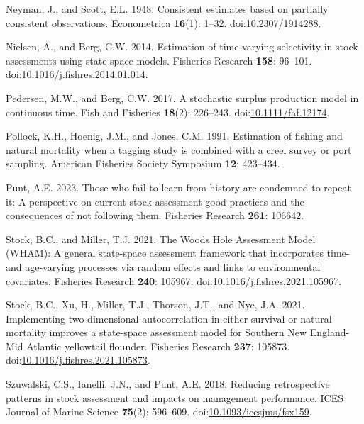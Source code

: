 \documentclass[
  12pt,
]{article}
\newlength{\cslhangindent}
\newenvironment{CSLReferences}[2] %
 {\begin{list}{}{%
  \setlength{\itemindent}{0pt}
  \setlength{\leftmargin}{0pt}
  \setlength{\parsep}{0pt}
  \ifodd #1
   \setlength{\leftmargin}{\cslhangindent}
   \setlength{\itemindent}{-1\cslhangindent}
  \fi
  \setlength{\itemsep}{#2\baselineskip}}}
 {\end{list}}
\begin{document}
\begin{CSLReferences}{1}{0}
Neyman, J., and Scott, E.L. 1948. Consistent estimates based on
partially consistent observations. Econometrica \textbf{16}(1): 1--32.
doi:\href{https://doi.org/10.2307/1914288}{10.2307/1914288}.

Nielsen, A., and Berg, C.W. 2014. Estimation of time-varying selectivity
in stock assessments using state-space models. Fisheries Research
\textbf{158}: 96--101.
doi:\href{https://doi.org/10.1016/j.fishres.2014.01.014}{10.1016/j.fishres.2014.01.014}.

Pedersen, M.W., and Berg, C.W. 2017. A stochastic surplus production
model in continuous time. Fish and Fisheries \textbf{18}(2): 226--243.
doi:\href{https://doi.org/10.1111/faf.12174}{10.1111/faf.12174}.

Pollock, K.H., Hoenig, J.M., and Jones, C.M. 1991. Estimation of fishing
and natural mortality when a tagging study is combined with a creel
survey or port sampling. American Fisheries Society Symposium
\textbf{12}: 423--434.

Punt, A.E. 2023. Those who fail to learn from history are condemned to
repeat it: A perspective on current stock assessment good practices and
the consequences of not following them. Fisheries Research \textbf{261}:
106642.

Stock, B.C., and Miller, T.J. 2021. The {W}oods {H}ole {A}ssessment
{M}odel ({WHAM}): {A} general state-space assessment framework that
incorporates time- and age-varying processes via random effects and
links to environmental covariates. Fisheries Research \textbf{240}:
105967.
doi:\href{https://doi.org/10.1016/j.fishres.2021.105967}{10.1016/j.fishres.2021.105967}.

Stock, B.C., Xu, H., Miller, T.J., Thorson, J.T., and Nye, J.A. 2021.
{Implementing two-dimensional autocorrelation in either survival or
natural mortality improves a state-space assessment model for Southern
New England-Mid Atlantic yellowtail flounder}. Fisheries Research
\textbf{237}: 105873.
doi:\href{https://doi.org/10.1016/j.fishres.2021.105873}{10.1016/j.fishres.2021.105873}.

Szuwalski, C.S., Ianelli, J.N., and Punt, A.E. 2018. Reducing
retrospective patterns in stock assessment and impacts on management
performance. ICES Journal of Marine Science \textbf{75}(2): 596--609.
doi:\href{https://doi.org/10.1093/icesjms/fsx159}{10.1093/icesjms/fsx159}.


\end{CSLReferences}
\end{document}
